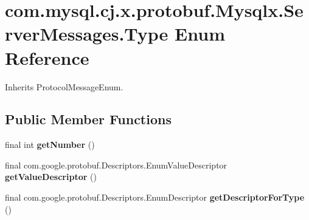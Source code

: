 \hypertarget{enumcom_1_1mysql_1_1cj_1_1x_1_1protobuf_1_1_mysqlx_1_1_server_messages_1_1_type}{}\section{com.\+mysql.\+cj.\+x.\+protobuf.\+Mysqlx.\+Server\+Messages.\+Type Enum Reference}
\label{enumcom_1_1mysql_1_1cj_1_1x_1_1protobuf_1_1_mysqlx_1_1_server_messages_1_1_type}


Inherits Protocol\+Message\+Enum.

\subsection*{Public Member Functions}
\begin{DoxyCompactItemize}
\item 
\mbox{\label{enumcom_1_1mysql_1_1cj_1_1x_1_1protobuf_1_1_mysqlx_1_1_server_messages_1_1_type_ac185c37952e211db6691f48b49679941}} 
final int {\bfseries get\+Number} ()
\item 
\mbox{\label{enumcom_1_1mysql_1_1cj_1_1x_1_1protobuf_1_1_mysqlx_1_1_server_messages_1_1_type_a2480cd91ef6126c779cf0d180ebaa606}} 
final com.\+google.\+protobuf.\+Descriptors.\+Enum\+Value\+Descriptor {\bfseries get\+Value\+Descriptor} ()
\item 
\mbox{\label{enumcom_1_1mysql_1_1cj_1_1x_1_1protobuf_1_1_mysqlx_1_1_server_messages_1_1_type_a45b68e7307b5f5a7b6ed300fa58111c6}} 
final com.\+google.\+protobuf.\+Descriptors.\+Enum\+Descriptor {\bfseries get\+Descriptor\+For\+Type} ()
\end{DoxyCompactItemize}
